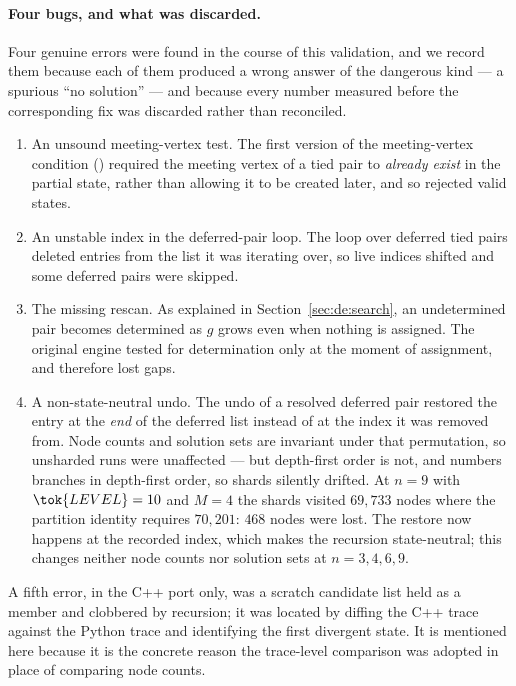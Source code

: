 \paragraph{Four bugs, and what was discarded.}
Four genuine errors were found in the course of this validation, and we record
them because each of them produced a wrong answer of the dangerous kind --- a
spurious ``no solution'' --- and because every number measured before the
corresponding fix was discarded rather than reconciled.
\begin{enumerate}\itemsep2pt
\item An unsound meeting-vertex test.  The first version of the meeting-vertex
condition () required the meeting vertex of a tied pair to \emph{already exist} in
the partial state, rather than allowing it to be created later, and so rejected
valid states.
\item An unstable index in the deferred-pair loop.  The loop over deferred tied
pairs deleted entries from the list it was iterating over, so live indices
shifted and some deferred pairs were skipped.
\item The missing rescan.  As explained in Section~\ref{sec:de:search}, an
undetermined pair becomes determined as $g$ grows even when nothing is assigned.
The original engine tested for determination only at the moment of assignment,
and therefore lost gaps.
\item A non-state-neutral undo.  The undo of a resolved deferred pair restored
the entry at the \emph{end} of the deferred list instead of at the index it was
removed from.  Node counts and solution sets are invariant under that
permutation, so unsharded runs were unaffected --- but depth-first order is not,
and  numbers branches in depth-first order, so shards silently
drifted.  At $n=9$ with $\tok{LEVEL}=10$ and $M=4$ the shards visited $69{,}733$
nodes where the partition identity requires $70{,}201$: $468$ nodes were lost.
The restore now happens at the recorded index, which makes the recursion
state-neutral; this changes neither node counts nor solution sets at
$n=3,4,6,9$.
\end{enumerate}
A fifth error, in the C++ port only, was a scratch candidate list held as a
member and clobbered by recursion; it was located by diffing the C++ trace
against the Python trace and identifying the first divergent state.  It is
mentioned here because it is the concrete reason the trace-level comparison was
adopted in place of comparing node counts.

